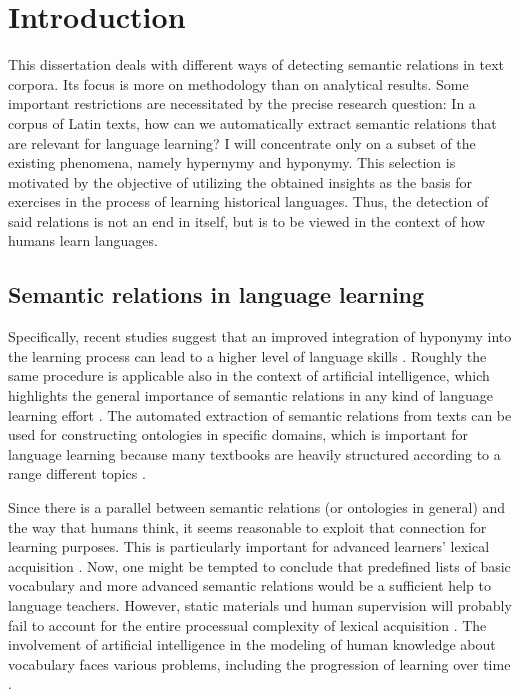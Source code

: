 \chapter{Introduction}
This dissertation deals with different ways of detecting semantic relations in text corpora. Its focus is more on methodology than on analytical results. Some important restrictions are necessitated by the precise research question: In a corpus of Latin texts, how can we automatically extract semantic relations that are relevant for language learning? I will concentrate only on a subset of the existing phenomena, namely hypernymy and hyponymy. This selection is motivated by the objective of utilizing the obtained insights as the basis for exercises in the process of learning historical languages. Thus, the detection of said relations is not an end in itself, but is to be viewed in the context of how humans learn languages. 

\section{Semantic relations in language learning}
Specifically, recent studies suggest that an improved integration of hyponymy into the learning process can lead to a higher level of language skills \parencite[196]{taslimExperimentalStudyTeaching2014}. Roughly the same procedure is applicable also in the context of artificial intelligence, which highlights the general importance of semantic relations in any kind of language learning effort \parencite[1306]{carlsonArchitectureNeverendingLanguage2010}. The automated extraction of semantic relations from texts can be used for constructing ontologies in specific domains, which is important for language learning because many textbooks are heavily structured according to a range different topics \parencite[192f.]{punuruLearningNontaxonomicalSemantic2012}. 

Since there is a parallel between semantic relations (or ontologies in general) and the way that humans think, it seems reasonable to exploit that connection for learning purposes. This is particularly important for advanced learners' lexical acquisition \parencite[56]{crossleyDevelopmentSemanticRelations2010}. Now, one might be tempted to conclude that predefined lists of basic vocabulary and more advanced semantic relations would be a sufficient help to language teachers. However, static materials und human supervision will probably fail to account for the entire processual complexity of lexical acquisition \parencite[71]{crossleyDevelopmentSemanticRelations2010}. The involvement of artificial intelligence in the modeling of human knowledge about vocabulary faces various problems, including the progression of learning over time \parencite[70]{crossleyDevelopmentSemanticRelations2010}. 

